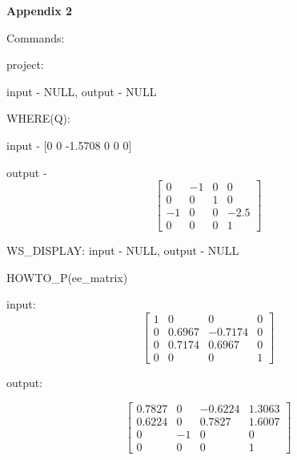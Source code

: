 \documentclass[12pt]{article}
\begin{document}
\newpage

\begin{center}
\textbf{Appendix 2}
\end{center}

Commands:

project:

input - NULL, output - NULL
	
WHERE(Q):

input - [0         0   -1.5708         0         0         0]
	
output -
\[\left[
\begin{array}{cccc}
0 & -1 & 0 & 0 \\
0 & 0 & 1 & 0 \\
-1 & 0 & 0 & -2.5\\
0 & 0 & 0 & 1
\end{array} \right]\]
         			
WS\_DISPLAY:
	input - NULL, output - NULL
	
HOWTO\_P(ee\_matrix)

input: 
\[\left[
\begin{array}{cccc}
1 & 0 & 0 & 0 \\
0 & 0.6967 & -0.7174 & 0 \\
0 & 0.7174 & 0.6967 & 0\\
0 & 0 & 0 & 1
\end{array} \right]\]       
 
 output:       
 
 \[\left[
\begin{array}{cccc}
0.7827  & 0 & -0.6224  & 1.3063 \\
0.6224  & 0 & 0.7827 & 1.6007 \\
0 & -1 & 0 & 0\\
0 & 0 & 0 & 1
\end{array} \right]\]    
\end{document}
